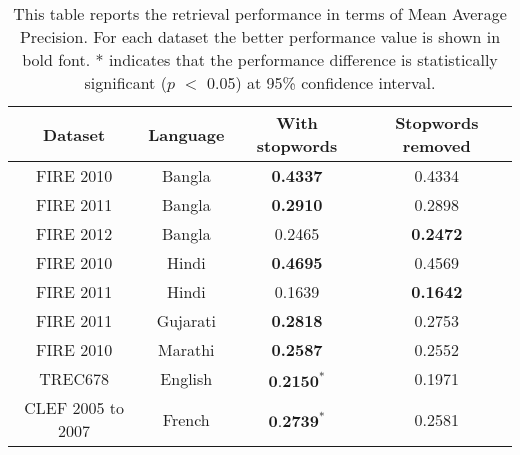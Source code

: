 \documentclass[sigconf]{acmart}
\begin{document}
\begin{table*}
 \begin{tabular}{|c|c|c|c|}
 \hline
 \textbf{Dataset}  & \textbf{Language} & \textbf{With stopwords} & 
\textbf{Stopwords removed}\\
 \hline
 \hline
FIRE 2010 & Bangla & \textbf{0.4337} & 0.4334\\ \hline
FIRE 2011 & Bangla & \textbf{0.2910} & 0.2898\\ \hline
FIRE 2012 & Bangla & 0.2465 & \textbf{0.2472}\\ \hline
\hline

FIRE 2010 & Hindi & \textbf{0.4695} & 0.4569\\ \hline
FIRE 2011 & Hindi & 0.1639 & \textbf{0.1642}\\ \hline
\hline
FIRE 2011 & Gujarati & \textbf{0.2818} & 0.2753\\ \hline
\hline
FIRE 2010 & Marathi & \textbf{0.2587} & 0.2552\\ \hline
\hline
TREC678 & English & $\textbf{0.2150}^*$ & 0.1971\\ \hline
\hline
CLEF 2005 to 2007 & French & $\textbf{0.2739}^*$ & 0.2581\\
\hline
  
\end{tabular}

\caption{This table reports the retrieval performance in terms of Mean Average Precision. For each dataset the better performance value is shown in bold font. * indicates that the performance difference is statistically significant ($p$ $<$ 0.05) at 95\% confidence interval.}
\label{tab:results}
\end{table*}


 
\end{document}

